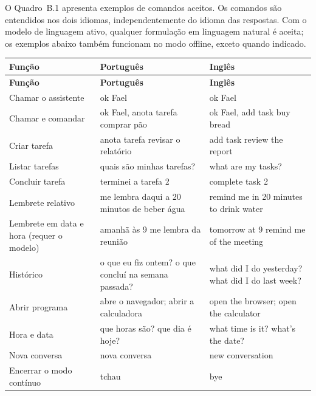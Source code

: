 \clearpage
\renewcommand{\thequadro}{B.\arabic{quadro}}
\setcounter{quadro}{0}

O Quadro~B.1 apresenta exemplos de comandos aceitos. Os comandos são entendidos nos dois idiomas,
independentemente do idioma das respostas. Com o modelo de linguagem ativo, qualquer formulação em
linguagem natural é aceita; os exemplos abaixo também funcionam no modo offline, exceto quando indicado.

\begin{singlespace}
\small
\begin{tabularx}{\textwidth}{|P{3.4cm}|L|L|}
\hline
\textbf{Função} & \textbf{Português} & \textbf{Inglês} \\ \hline
\endfirsthead
\hline
\textbf{Função} & \textbf{Português} & \textbf{Inglês} \\ \hline
\endhead
Chamar o assistente & ok Fael & ok Fael \\ \hline
Chamar e comandar & ok Fael, anota tarefa comprar pão & ok Fael, add task buy bread \\ \hline
Criar tarefa & anota tarefa revisar o relatório & add task review the report \\ \hline
Listar tarefas & quais são minhas tarefas? & what are my tasks? \\ \hline
Concluir tarefa & terminei a tarefa 2 & complete task 2 \\ \hline
Lembrete relativo & me lembra daqui a 20 minutos de beber água & remind me in 20 minutes to drink water \\ \hline
Lembrete em data e hora (requer o modelo) & amanhã às 9 me lembra da reunião & tomorrow at 9 remind me of the meeting \\ \hline
Histórico & o que eu fiz ontem? o que concluí na semana passada? & what did I do yesterday? what did I do last week? \\ \hline
Abrir programa & abre o navegador; abrir a calculadora & open the browser; open the calculator \\ \hline
Hora e data & que horas são? que dia é hoje? & what time is it? what's the date? \\ \hline
Nova conversa & nova conversa & new conversation \\ \hline
Encerrar o modo contínuo & tchau & bye \\ \hline
\end{tabularx}
\end{singlespace}

